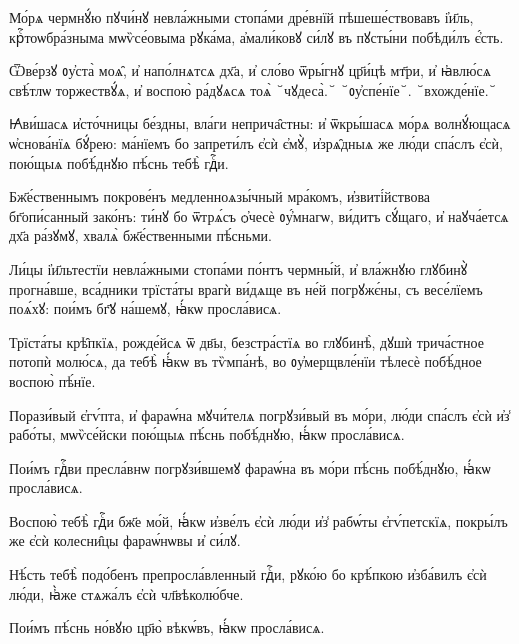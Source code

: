 
\label{tone.4}

\cuLettrine
Мо́рѧ чермнꙋ́ю пꙋчи́нꙋ невла́жными стопа́ми дре́внїй  пѣшеше́ствовавъ і҆и҃ль, крⷭ҇тоѡбра́зныма мѡѷсе́овыма  рꙋка́ма, а҆мали́ковꙋ си́лꙋ въ пꙋсты́ни побѣди́лъ є҆́сть. 
%

Ѿве́рзꙋ ᲂу҆ста̀ моѧ̑, и҆ напо́лнѧтсѧ  дх҃а, и҆ сло́во ѿры́гнꙋ цр҃и́цѣ мт҃ри, и҆ ꙗ҆влю́сѧ  свѣ́тлѡ торжествꙋ́ѧ, и҆ воспою̀ ра́дꙋѧсѧ тоѧ̀ ꙾чꙋдеса̀.꙾
 ꙾ᲂу҆спе́нїе꙾.  ꙾вхожде́нїе.꙾
%

\hKv Ꙗ҆ви́шасѧ и҆сто́чницы бе́здны, вла́ги  неприча̑стны: и҆ ѿкры́шасѧ мо́рѧ волнꙋ́ющасѧ ѡ҆снова́нїѧ  бꙋ́рею: ма́нїемъ бо запрети́лъ є҆сѝ є҆мꙋ̀, и҆зрѧ̑дныѧ же  лю́ди  спа́слъ є҆сѝ, пою́щыѧ  побѣ́днꙋю пѣ́снь тебѣ̀ гдⷭ҇и. 
%

\hKv Бж҃е́ственнымъ покрове́нъ  медленноѧзы́чный мра́комъ, и҆звиті́йствова бг҃опи́санный  зако́нъ: ти́нꙋ бо ѿтрѧ́съ ѻ҆чесѐ ᲂу҆́мнагѡ, ви́дитъ  сꙋ́щаго, и҆ наꙋча́етсѧ дх҃а ра́зꙋмꙋ, хвалѧ̀ бж҃е́ственными  пѣ́сньми. 
%

\hKv Ли́цы і҆и҃льтестїи невла́жными стопа́ми  по́нтъ чермны́й, и҆ вла́жнꙋю глꙋбинꙋ̀ прогна́вше, вса́дники  трїста́ты врагѝ ви́дѧще въ не́й погрꙋжє́ны, съ весе́лїемъ  поѧ́хꙋ: пои́мъ бг҃ꙋ на́шемꙋ, ꙗ҆́кѡ просла́висѧ. 
%

\hKv Трїста́ты крѣ̑пкїѧ, рожде́йсѧ ѿ дв҃ы, безстра́стїѧ во  глꙋбинѣ̀, дꙋшѝ трича́стное потопѝ молю́сѧ, да тебѣ̀  ꙗ҆́кѡ въ тѷмпа́нѣ, во ᲂу҆мерщвле́нїи тѣлесѐ побѣ́дное  воспою̀ пѣ́нїе. 

\hKv Порази́вый є҆гѵ́пта, и҆ фараѡ́на мꙋчи́телѧ погрꙋзи́вый въ  мо́ри, лю́ди спа́слъ є҆сѝ и҆з̾  рабо́ты, мѡѷсе́йски пою́щыѧ пѣ́снь побѣ́днꙋю,  ꙗ҆́кѡ просла́висѧ. 

\hKv Пои́мъ гдⷭ҇ви пресла́внѡ погрꙋзи́вшемꙋ фараѡ́на въ мо́ри  пѣ́снь побѣ́днꙋю, ꙗ҆́кѡ просла́висѧ. 

\hKv Воспою̀ тебѣ̀ гдⷭ҇и бж҃е мо́й, ꙗ҆́кѡ и҆зве́лъ є҆сѝ лю́ди  и҆з̾ рабѡ́ты є҆гѵ́петскїѧ, покры́лъ же є҆сѝ колесни̑цы  фараѡ́нѡвы и҆ си́лꙋ. 

\hKv Нѣ́сть тебѣ̀ подо́бенъ препросла́вленный гдⷭ҇и, рꙋко́ю бо  крѣ́пкою и҆зба́вилъ є҆сѝ лю́ди, ꙗ҆̀же стѧжа́лъ є҆сѝ  чл҃вѣколю́бче. 

\hKv Пои́мъ пѣ́снь но́вꙋю цр҃ю̀ вѣкѡ́въ, ꙗ҆́кѡ просла́висѧ. 

